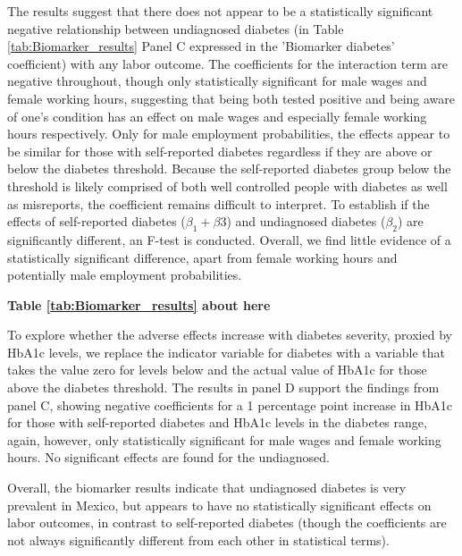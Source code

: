 \documentclass[12pt,english]{article}
\begin{document}
The results suggest that there does not appear to be a statistically significant negative relationship between undiagnosed diabetes (in Table \ref{tab:Biomarker_results} Panel C expressed in the 'Biomarker diabetes' coefficient) with any labor outcome. The coefficients for the interaction term are negative throughout, though only statistically significant for male wages and female working hours, suggesting that being both tested positive and being aware of one's condition has an effect on male wages and especially female working hours respectively. Only for male employment probabilities, the effects appear to be similar for those
with self-reported diabetes regardless if they are above or below the diabetes threshold.
Because the self-reported diabetes group below the threshold is likely comprised of both
well controlled people with diabetes as well as misreports, the coefficient remains difficult
to interpret. To establish if the effects of self-reported diabetes ($\beta_{1} + \beta{3}$) and undiagnosed
diabetes ($\beta_{2}$) are significantly different, an F-test is conducted. Overall, we find little
evidence of a statistically significant difference, apart from female working hours and
potentially male employment probabilities.

\begin{center}
	\textbf{Table \ref{tab:Biomarker_results} about here}
\end{center}


To explore whether the adverse effects increase with diabetes severity, proxied by
HbA1c levels, we replace the indicator variable for diabetes with a variable that takes
the value zero for levels below and the actual value of HbA1c for those above the diabetes
threshold. The results in panel D support the findings from panel C, showing negative
coefficients for a 1 percentage point increase in HbA1c for those with self-reported diabetes
and HbA1c levels in the diabetes range, again, however, only statistically significant for
male wages and female working hours. No significant effects are found for the undiagnosed.

Overall, the biomarker results indicate that undiagnosed diabetes is very prevalent in
Mexico, but appears to have no statistically significant effects on labor outcomes, in contrast to self-reported diabetes (though the coefficients are not always significantly different from each other in statistical terms).
\end{document}
